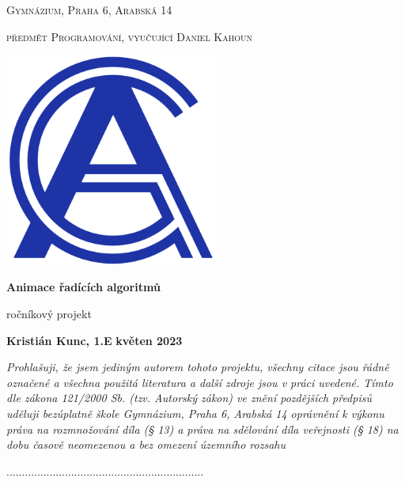 \documentclass{article}
\begin{document}
\begin{titlepage}
	\centering

 	{\scshape\large Gymnázium, Praha 6, Arabská 14\par}
	{\scshape\normalsize předmět Programování, vyučující Daniel Kahoun\par}

    \vspace{3cm}
	\includegraphics[width=7cm]{img/gyarab_logo.png} \par\vspace{1cm}
	\vspace{0.5cm}

	{\Huge\bfseries Animace řadících algoritmů\par}
    {\Large ročníkový projekt\par}

	\vspace{4.25cm}
    \textbf{\large Kristián Kunc, 1.E} \hfill \textbf{\large květen 2023}

\end{titlepage}

\vspace*{\fill}

\thispagestyle{empty}
\emph{Prohlašuji, že jsem jediným autorem tohoto projektu, všechny citace jsou
řádně označené a všechna použitá literatura a další zdroje jsou v práci uvedené.
Tímto dle zákona 121/2000 Sb. (tzv. Autorský zákon) ve znění pozdějších předpisů uděluji
bezúplatně škole Gymnázium, Praha 6, Arabská 14 oprávnění k výkonu práva na rozmnožování díla
(§ 13) a práva na sdělování díla veřejnosti (§ 18) na dobu časově neomezenou a bez omezení
územního rozsahu}

\vspace{1cm}
\hfill{................................................................}
\pagebreak
\end{document}
